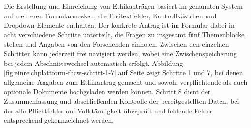 \documentclass[a4paper,12pt,twoside]{scrreprt}
\begin{document}
Die Erstellung und Einreichung von Ethikanträgen basiert im genannten System auf mehreren Formularmasken, die Freitextfelder, Kontrollkästchen und Dropdown-Elemente enthalten. Der konkrete Antrag ist im Formular dabei in acht verschiedene Schritte unterteilt, die Fragen zu insgesamt fünf Themenblöcke stellen und Angaben von den Forschenden einholen. Zwischen den einzelnen Schritten kann jederzeit frei navigiert werden, wobei eine Zwischenspeicherung bei jedem Abschnittswechsel automatisch erfolgt. Abbildung \ref{fig:einreichplattform-fhcw-schritt-1-7} auf Seite \pageref{fig:einreichplattform-fhcw-schritt-1-7} zeigt Schritte 1 und 7, bei denen allgemeine Angaben zum Ethikantrag gemacht und sowohl verpflichtende als auch optionale Dokumente hochgeladen werden können. Schritt 8 dient der Zusammenfassung und abschließenden Kontrolle der bereitgestellten Daten, bei der alle Pflichtfelder auf Vollständigkeit überprüft und fehlende Felder entsprechend gekennzeichnet werden.
\end{document}
